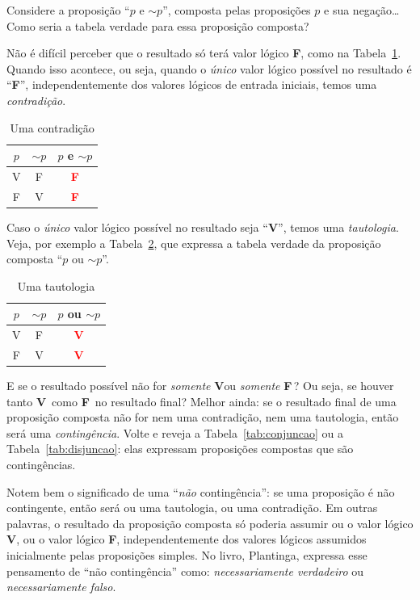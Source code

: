 \documentclass[12pt]{article}
\theoremstyle{definition}
\newcommand{\V}{\textbf{V}}
\newcommand{\F}{\textbf{F}}
\newcommand{\N}{\ensuremath{\sim\!}}
\begin{document}
Considere a proposição ``$p$ e $\N p$'', composta pelas proposições $p$ e sua
negação\ldots 
Como seria a tabela verdade para essa proposição composta?

Não é difícil perceber que o resultado só terá valor lógico \F, como na 
Tabela~\ref{tab:contradicao}.
Quando isso acontece, ou seja, quando o \textit{único} valor lógico possível no
resultado é ``\F'', independentemente dos valores lógicos de entrada iniciais,
temos uma \textit{contradição}.

\begin{table}[!h]%
\centering
 \scalebox{0.8}
	{
  \begin{tabular}{ccc}
   \toprule
   $p$ & $\N p$ & $p$ e $\N p$\\
		 \midrule
   V   & F      & \textbf{\textcolor{red}{F}} \\
		 F   & V      & \textbf{\textcolor{red}{F}}\\
   \bottomrule
  \end{tabular}
	}
\caption{Uma contradição}
\label{tab:contradicao}
\end{table}

Caso o \textit{único} valor lógico possível no resultado seja ``\V'', temos uma
\textit{tautologia}.
Veja, por exemplo a Tabela~\ref{tab:tautologia}, que expressa a tabela verdade
da proposição composta ``$p$ ou $\N p$''.

\begin{table}[!h]%
\centering
 \scalebox{0.8}
	{
  \begin{tabular}{ccc}
   \toprule
   $p$ & $\N p$ & $p$ ou $\N p$\\
		 \midrule
   V   & F      & \textbf{\textcolor{red}{V}} \\
		 F   & V      & \textbf{\textcolor{red}{V}}\\
   \bottomrule
  \end{tabular}
	}
\caption{Uma tautologia}
\label{tab:tautologia}
\end{table}

E se o resultado possível não for \textit{somente} \V ou \textit{somente} \F\,?
Ou seja, se houver tanto \V\ como \F\ no resultado final?
Melhor ainda: se o resultado final de uma proposição composta não for nem uma
contradição, nem uma tautologia, então será uma \textit{contingência}.
Volte e reveja a Tabela~\ref{tab:conjuncao} ou  a Tabela~\ref{tab:disjuncao}:
elas expressam proposições compostas que são contingências.

Notem bem o significado de uma ``\textit{não} contingência'': se uma proposição
é não contingente, então será ou uma tautologia, ou uma contradição.
Em outras palavras, o resultado da proposição composta só poderia assumir ou o 
valor lógico \V, ou o valor lógico \F, independentemente dos valores lógicos
assumidos inicialmente pelas proposições simples.
No livro, Plantinga, expressa esse pensamento de ``não contingência'' como:
\textit{necessariamente verdadeiro} ou \textit{necessariamente falso}.  
\end{document}
